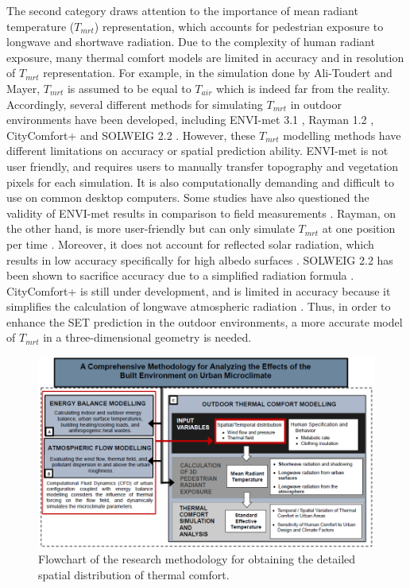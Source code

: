 \documentclass[smallextended]{svjour3}
\begin{document}
The second category draws attention to the importance of mean radiant temperature ($T_{mrt}$) representation, which accounts for pedestrian exposure to longwave and shortwave radiation. Due to the complexity of human radiant exposure, 
many thermal comfort models are limited in accuracy and in resolution of $T_{mrt}$ representation. For example, in the simulation done by Ali-Toudert and Mayer, $T_{mrt}$ is assumed to be equal to $T_{air}$ which is indeed far from the reality. Accordingly, several different methods for simulating $T_{mrt}$ in outdoor environments have been developed, including ENVI-met 3.1 \citep{bruse2004envi}, Rayman 1.2 \citep{matzarakis2007modelling}, CityComfort+ \citep{huang2014citycomfort+} and SOLWEIG 2.2 \citep{lindberg2008solweig}. However, these $T_{mrt}$ modelling methods have different limitations on accuracy or spatial prediction ability. ENVI-met is not user friendly, and requires users to manually transfer topography and vegetation pixels for each simulation. It is also computationally demanding and difficult to use on common desktop computers. Some studies have also questioned the validity of ENVI-met results in comparison to field measurements \citep{toudertdependence}. Rayman, on the other hand, is more user-friendly but can only simulate $T_{mrt}$ at one position per time \citep{huang2014citycomfort+}. Moreover, it does not account for reflected solar radiation, which results in low accuracy specifically for high albedo surfaces \citep{thorsson2007different}. SOLWEIG 2.2 has been shown to sacrifice accuracy due to a simplified radiation formula \citep{lindberg2008solweig}. CityComfort+ is still under development, and is limited in accuracy because it simplifies the calculation of longwave atmospheric radiation \citep{huang2014citycomfort+}.  Thus, in order to enhance the SET prediction in the outdoor environments, a more accurate model of $T_{mrt}$ in a three-dimensional geometry is needed.
\begin{figure}[t]
\graphicspath{ {image/} }
\centerline{\includegraphics[width=\textwidth]{FlowChart_2.png}}
\caption{Flowchart of the research methodology for obtaining the detailed spatial distribution of thermal comfort.}
\label{Fig.FlowChart}
\end{figure}
\end{document}
